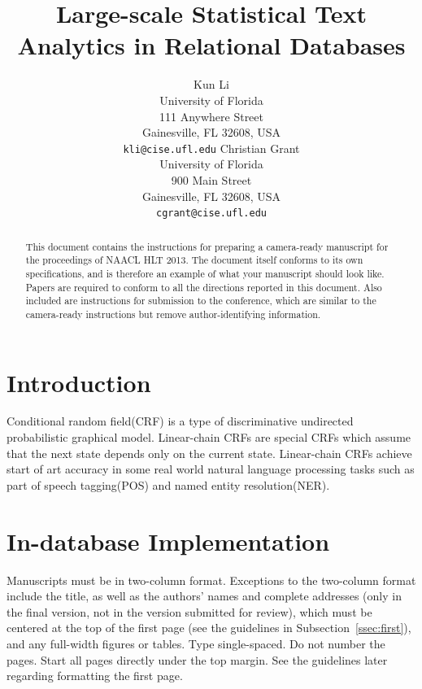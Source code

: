 \documentclass[11pt,letterpaper]{article}
\title{Large-scale Statistical Text Analytics in Relational Databases\Thanks{This
    and NAACL proceedings, including those for 
    the {\em International Joint Conference on Artificial Intelligence}.  
    This second version clarifies the procedure for 
    submitting for double-blind reviewing.}}
\author{Kun Li\\
	    University of Florida\\
	    111 Anywhere Street\\
	    Gainesville, FL 32608, USA\\
	    {\tt kli@cise.ufl.edu}
	  \And
	Christian Grant\\
  	University of Florida\\
  	900 Main Street\\
	    Gainesville, FL 32608, USA\\
  {\tt cgrant@cise.ufl.edu}}
\date{}
\begin{document}
\maketitle
\begin{abstract}
  This document contains the instructions for preparing a camera-ready
  manuscript for the proceedings of NAACL HLT 2013.  The document itself conforms
  to its own specifications, and is therefore an example of what
  your manuscript should look like.  Papers are required to conform to
  all the directions reported in this document.  Also included are instructions for
  submission to the conference, which are similar to the camera-ready instructions
  but remove author-identifying information.
\end{abstract}

\section{Introduction}
Conditional random field(CRF) is a type of discriminative undirected probabilistic graphical model.
Linear-chain CRFs are special CRFs which assume that the next state depends only on the current state. 
Linear-chain CRFs achieve start of art accuracy in some real world natural language processing tasks such
as part of speech tagging(POS) and named entity resolution(NER).

\section{In-database Implementation}

Manuscripts must be in two-column format.  Exceptions to the
two-column format include the title, as well as the 
authors' names and complete
addresses (only in the final version, not in the version submitted for review), 
which must be centered at the top of the first page (see
the guidelines in Subsection~\ref{ssec:first}), and any full-width
figures or tables.  Type single-spaced.  Do not number the pages.
Start all pages directly under the top margin.  See the guidelines
later regarding formatting the first page.


\end{document}
